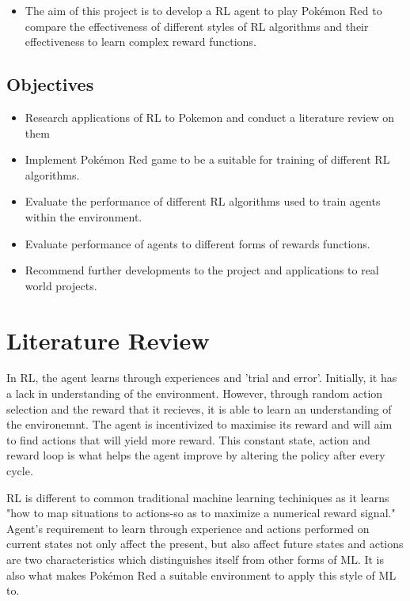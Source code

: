 \documentclass{surrey_disso_style}
\begin{document}
\begin{itemize}
   \item [\ding{54}] The aim of this project is to develop a RL agent to play Pokémon Red to compare the effectiveness of different styles of RL algorithms and their effectiveness to learn complex reward functions.
\end{itemize}

\subsection{Objectives}

\begin{itemize}
   \item [\ding{169}] Research applications of RL to Pokemon and conduct a literature review on them
   \item [\ding{169}] Implement Pokémon Red game to be a suitable for training of different RL algorithms.
   \item [\ding{169}] Evaluate the performance of different RL algorithms used to train agents within the environment.
   \item [\ding{169}] Evaluate performance of agents to different forms of rewards functions.
   \item [\ding{169}] Recommend further developments to the project and applications to real world projects.
\end{itemize}

\section{Literature Review}
In RL, the agent learns through experiences and 'trial and error'. Initially, it has a lack in understanding of the environment. However, through random action selection and the reward that it recieves, it is able to learn an understanding of the environemnt. The agent is incentivized to maximise its reward and will aim to find actions that will yield more reward. This constant state, action and reward loop is what helps the agent improve by altering the policy after every cycle. 
\par

RL is different to common traditional machine learning techiniques as it learns "how to map situations to actions-so as to maximize a numerical reward signal." Agent's requirement to learn through experience and actions performed on current states not only affect the present, but also affect future states and actions are two characteristics which distinguishes itself from other forms of ML. It is also what makes Pokémon Red a suitable environment to apply this style of ML to.
\par
\end{document}
